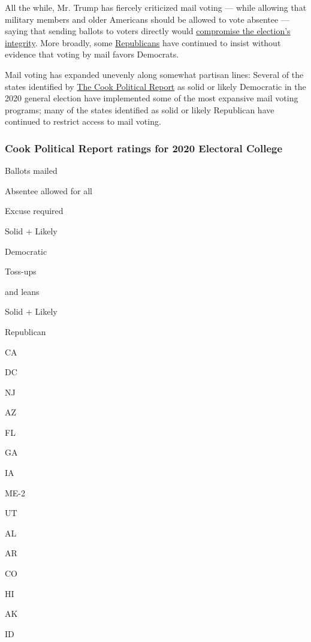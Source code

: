 All the while, Mr. Trump has fiercely criticized mail voting --- while
allowing that military members and older Americans should be allowed to
vote absentee --- saying that sending ballots to voters directly would
\href{https://www.nytimes3xbfgragh.onion/article/mail-in-voting-explained.html}{compromise
the election's integrity}. More broadly, some
\href{https://www.nytimes3xbfgragh.onion/2020/04/08/us/politics/republicans-vote-by-mail.html}{Republicans}
have continued to insist without evidence that voting by mail favors
Democrats.

Mail voting has expanded unevenly along somewhat partisan lines: Several
of the states identified by
\href{https://cookpolitical.com/sites/default/files/2020-07/EC\%20Ratings.072320.2.pdf?}{The
Cook Political Report} as solid or likely Democratic in the 2020 general
election have implemented some of the most expansive mail voting
programs; many of the states identified as solid or likely Republican
have continued to restrict access to mail voting.

\hypertarget{cook-political-report-ratings-for-2020-electoral-college}{%
\subsubsection{Cook Political Report ratings for 2020 Electoral
College}\label{cook-political-report-ratings-for-2020-electoral-college}}

Ballots mailed

Absentee allowed for all

Excuse required

Solid + Likely

Democratic

Toss-ups

and leans

Solid + Likely

Republican

CA

DC

NJ

AZ

FL

GA

IA

ME-2

UT

AL

AR

CO

HI

AK

ID

